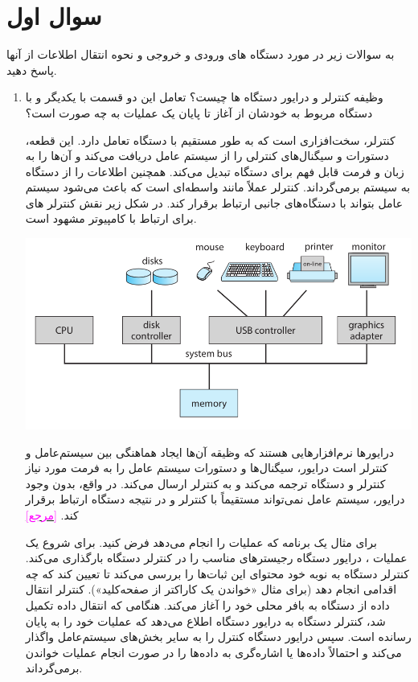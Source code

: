 \section{سوال اول}
به سوالات زیر در مورد دستگاه های ورودی و خروجی و نحوه انتقال اطلاعات از آنها پاسخ دهید.
\begin{enumerate}
	\item 
	وظیفه کنترلر و درایور دستگاه ها چیست؟ تعامل این دو قسمت با یکدیگر و با دستگاه مربوط به خودشان از آغاز تا پایان یک عملیات  به چه صورت است؟
	
	\begin{qsolve}[]
کنترلر، سخت‌افزاری است که به طور مستقیم با دستگاه  تعامل دارد. این قطعه، دستورات و سیگنال‌های کنترلی را از سیستم عامل دریافت می‌کند و آن‌ها را به زبان و فرمت قابل فهم برای دستگاه تبدیل می‌کند. همچنین اطلاعات را از دستگاه به سیستم برمی‌گرداند. کنترلر عملاً مانند واسطه‌ای است که باعث می‌شود سیستم عامل بتواند با دستگاه‌های جانبی ارتباط برقرار کند. در شکل زیر نقش کنترلر های  برای ارتباط با کامپیوتر مشهود است.
	\begin{center}
		\includegraphics*[width=0.8\linewidth]{pics/img1.png}
	\end{center}
	
	درایورها نرم‌افزارهایی هستند که وظیقه آن‌ها ایجاد هماهنگی بین سیستم‌عامل و کنترلر است  درایور، سیگنال‌ها و دستورات سیستم عامل را به فرمت مورد نیاز کنترلر و دستگاه ترجمه می‌کند و به کنترلر ارسال می‌کند. در واقع، بدون وجود درایور، سیستم عامل نمی‌تواند مستقیماً با کنترلر و در نتیجه دستگاه ارتباط برقرار کند. \href{https://www.geeksforgeeks.org/device-driver-and-its-purpose/}{\textcolor{magenta}{[مرجع]}}

	برای مثال یک برنامه که عملیات  را انجام می‌دهد فرض کنید. برای شروع یک عملیات ، درایور دستگاه رجیستر‌های مناسب را در کنترلر دستگاه بارگذاری می‌کند. کنترلر دستگاه به نوبه خود محتوای این ثبات‌ها را بررسی می‌کند تا تعیین کند که چه اقدامی انجام دهد (برای مثال «خواندن یک کاراکتر از صفحه‌کلید»). کنترلر انتقال داده از دستگاه به بافر محلی خود را آغاز می‌کند. هنگامی که انتقال داده تکمیل شد، کنترلر دستگاه به درایور دستگاه اطلاع می‌دهد که عملیات خود را به پایان رسانده است. سپس درایور دستگاه کنترل را به سایر بخش‌های سیستم‌عامل واگذار می‌کند و احتمالاً داده‌ها یا اشاره‌گری به داده‌ها را در صورت انجام عملیات خواندن برمی‌گرداند. 
	\end{qsolve}
	

\end{enumerate}
